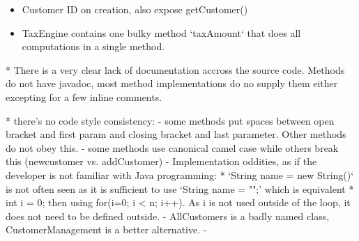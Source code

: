 \begin{itemize}
	 \item Customer ID on creation, also expose getCustomer() 


	 \item TaxEngine contains one bulky method `taxAmount` that does all computations in a single method. 

\end{itemize}



* There is a very clear lack of documentation accross the source code. Methods do not have javadoc, most method implementations do no supply them either excepting for a few inline comments. 

* there's no code style consistency: 
	- some methods put spaces between open bracket and first param and closing bracket and last parameter. Other methods do not obey this. 
	- some methods use canonical camel case while others break this (newcustomer vs. addCustomer)
	- Implementation oddities, as if the developer is not familiar with Java programming: 
		* `String name = new String()` is not often seen as it is sufficient to use `String name = "";' which is equivalent
		* int i = 0; then using for(i=0; i < n; i++). As i is not used outside of the loop, it does not need to be defined outside. 
	- AllCustomers is a badly named class, CustomerManagement is a better alternative. 
	- 


